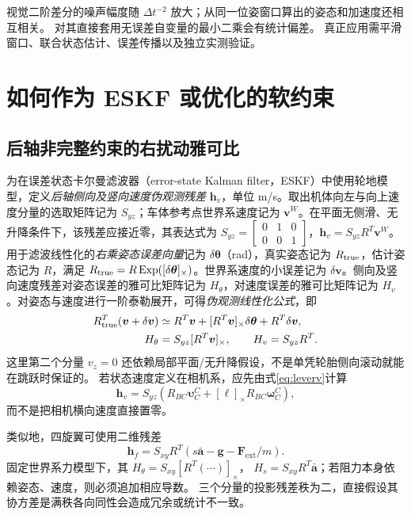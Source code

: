 \documentclass[UTF8,a4paper,fontset=fandol,11pt]{ctexart}
\newcommand{\sk}[1]{[#1]_{\times}}
\newcommand{\vct}[1]{\bm #1}
\begin{document}
视觉二阶差分的噪声幅度随 $\Delta t^{-2}$ 放大；从同一位姿窗口算出的姿态和加速度还相互相关。
对其直接套用无误差自变量的最小二乘会有统计偏差。
真正应用需平滑窗口、联合状态估计、误差传播以及独立实测验证。

\section{如何作为 ESKF 或优化的软约束}
\subsection{后轴非完整约束的右扰动雅可比}
为在误差状态卡尔曼滤波器（error-state Kalman filter，ESKF）中使用轮地模型，定义\emph{后轴侧向及竖向速度伪观测残差} $\vct h_v$，单位 m/s。取出机体向左与向上速度分量的选取矩阵记为 $S_{yz}$；车体参考点世界系速度记为 $\vct v^W$。在平面无侧滑、无升降条件下，该残差应接近零，其表达式为 $S_{yz}=\begin{bmatrix}0&1&0\\0&0&1\end{bmatrix}$，$\vct h_v=S_{yz}R^T\vct v^W$。
用于滤波线性化的\emph{右乘姿态误差向量}记为 $\delta\vct\theta$（rad），真实姿态记为 $R_{\rm true}$，估计姿态记为 $R$，满足 $R_{\rm true}=R\operatorname{Exp}(\sk{\delta\vct\theta})$。世界系速度的小误差记为 $\delta\vct v$。侧向及竖向速度残差对姿态误差的雅可比矩阵记为 $H_\theta$，对速度误差的雅可比矩阵记为 $H_v$。对姿态与速度进行一阶泰勒展开，可得\emph{伪观测线性化公式}，即
\begin{align}
 R_{\rm true}^T(\vct v+\delta\vct v)
 &\simeq R^T\vct v+\sk{R^T\vct v}\delta\vct\theta+R^T\delta\vct v,\\
 H_\theta&=S_{yz}\sk{R^T\vct v},\qquad H_v=S_{yz}R^T.\label{eq:jacobian}
\end{align}
这里第二个分量 $v_z=0$ 还依赖局部平面/无升降假设，不是单凭轮胎侧向滚动就能在跳跃时保证的。
若状态速度定义在相机系，应先由式\eqref{eq:leverv}计算
\begin{equation}
 \vct h_v=S_{yz}\left(R_{BC}\vct\upsilon_C^C+
 \sk{\vct\ell}R_{BC}\vct\omega_C^C\right),
\end{equation}
而不是把相机横向速度直接置零。

类似地，四旋翼可使用二维残差
\begin{equation}
 \vct h_f=S_{xy}R^T
 \left(s\bar{\vct a}-\vct g-\vct F_{\mathrm{ext}}/m\right).
\end{equation}
固定世界系力模型下，其 $H_\theta=S_{xy}\sk{R^T(\cdots)}$，
$H_s=S_{xy}R^T\bar{\vct a}$；若阻力本身依赖姿态、速度，则必须追加相应导数。
三个分量的投影残差秩为二，直接假设其协方差是满秩各向同性会造成冗余或统计不一致。
\end{document}
